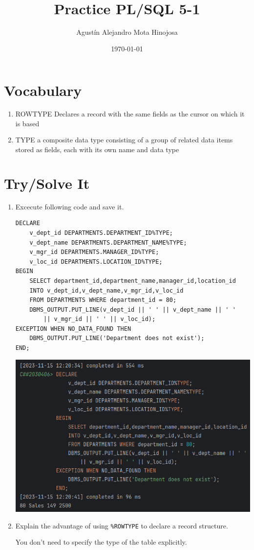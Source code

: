\documentclass[11pt]{article}
\author{Agustín Alejandro Mota Hinojosa}
\date{\today}
\title{Practice PL/SQL 5-1}
\begin{document}
\maketitle
\tableofcontents

\section{Vocabulary}
\label{sec:org441f954}

\begin{enumerate}
\item ROWTYPE Declares a record with the same fields as the cursor on which it is based
\item TYPE a composite data type consisting of a group of related data items stored as fields, each with its own name and data type
\end{enumerate}
\section{Try/Solve It}
\label{sec:org144a8c0}
\begin{enumerate}
\item Excecute following code and save it.
\begin{verbatim}
DECLARE
    v_dept_id DEPARTMENTS.DEPARTMENT_ID%TYPE;
    v_dept_name DEPARTMENTS.DEPARTMENT_NAME%TYPE;
    v_mgr_id DEPARTMENTS.MANAGER_ID%TYPE;
    v_loc_id DEPARTMENTS.LOCATION_ID%TYPE;
BEGIN
    SELECT department_id,department_name,manager_id,location_id
    INTO v_dept_id,v_dept_name,v_mgr_id,v_loc_id
    FROM DEPARTMENTS WHERE department_id = 80;
    DBMS_OUTPUT.PUT_LINE(v_dept_id || ' ' || v_dept_name || ' '
        || v_mgr_id || ' ' || v_loc_id);
EXCEPTION WHEN NO_DATA_FOUND THEN
    DBMS_OUTPUT.PUT_LINE('Department does not exist');
END;
\end{verbatim}
\begin{center}
\includegraphics[width=.9\linewidth]{./resources/dbms_5-1.png}
\end{center}

\item Explain the advantage of using \texttt{\%ROWTYPE} to declare a record structure.

You don't need to specify the type of the table explicitly.
\end{enumerate}
\end{document}
